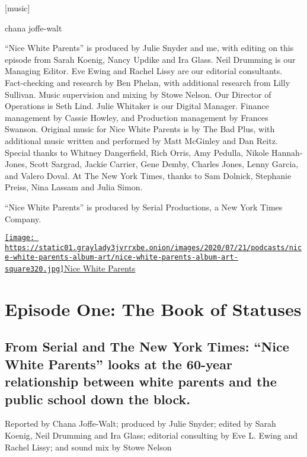 {[}music{]}

chana joffe-walt

``Nice White Parents'' is produced by Julie Snyder and me, with editing
on this episode from Sarah Koenig, Nancy Updike and Ira Glass. Neil
Drumming is our Managing Editor. Eve Ewing and Rachel Lissy are our
editorial consultants. Fact-checking and research by Ben Phelan, with
additional research from Lilly Sullivan. Music supervision and mixing by
Stowe Nelson. Our Director of Operations is Seth Lind. Julie Whitaker is
our Digital Manager. Finance management by Cassie Howley, and Production
management by Frances Swanson. Original music for Nice White Parents is
by The Bad Plus, with additional music written and performed by Matt
McGinley and Dan Reitz. Special thanks to Whitney Dangerfield, Rich
Orris, Amy Pedulla, Nikole Hannah-Jones, Scott Sargrad, Jackie Carrier,
Gene Demby, Charles Jones, Lenny Garcia, and Valero Doval. At The New
York Times, thanks to Sam Dolnick, Stephanie Preiss, Nina Lassam and
Julia Simon.

``Nice White Parents'' is produced by Serial Productions, a New York
Times Company.

\href{https://www.nytimes3xbfgragh.onion/column/nice-white-parents}{\texttt{[image: https://static01.graylady3jvrrxbe.onion/images/2020/07/21/podcasts/nice-white-parents-album-art/nice-white-parents-album-art-square320.jpg]}Nice
White Parents}

\hypertarget{episode-one-the-book-of-statuses-1}{%
\section{Episode One: The Book of
Statuses}\label{episode-one-the-book-of-statuses-1}}

\hypertarget{from-serial-and-the-new-york-times-nice-white-parents-looks-at-the-60-year-relationship-between-white-parents-and-the-public-school-down-the-block-1}{%
\subsection{From Serial and The New York Times: ``Nice White Parents''
looks at the 60-year relationship between white parents and the public
school down the
block.}\label{from-serial-and-the-new-york-times-nice-white-parents-looks-at-the-60-year-relationship-between-white-parents-and-the-public-school-down-the-block-1}}

Reported by Chana Joffe-Walt; produced by Julie Snyder; edited by Sarah
Koenig, Neil Drumming and Ira Glass; editorial consulting by Eve L.
Ewing and Rachel Lissy; and sound mix by Stowe Nelson

